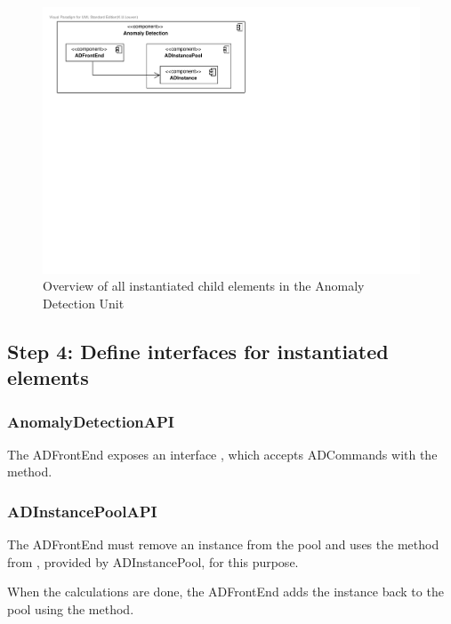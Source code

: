 \begin{figure}[H]
	\begin{centering}
		\includegraphics[width=\textwidth]{figs/add-it6-elements.pdf}
		\caption{Overview of all instantiated child elements in the Anomaly
		Detection Unit}
		\label{fig:it6/elements}
	\end{centering}
\end{figure}

\subsection{Step 4: Define interfaces for instantiated elements}
\label{add:it6/interfaces}

\subsubsection{AnomalyDetectionAPI}

\npar The ADFrontEnd exposes an interface , which
accepts ADCommands with the  method.

\subsubsection{ADInstancePoolAPI}

\npar The ADFrontEnd must remove an instance from the pool and uses the
 method from , provided by
ADInstancePool, for this purpose.

\npar When the calculations are done, the ADFrontEnd adds the instance back to
the pool using the  method.

